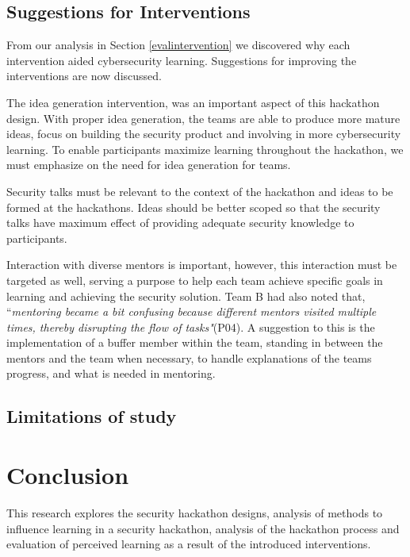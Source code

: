 \documentclass[runningheads]{llncs}
\begin{document}


\subsection{Suggestions for Interventions}
From our analysis in Section \ref{evalintervention} we discovered why each intervention aided cybersecurity learning. Suggestions for improving the interventions are now discussed.

The idea generation intervention, was an important aspect of this hackathon design. With proper idea generation, the teams are able to produce more mature ideas, focus on building the security product and involving in more cybersecurity learning. To enable participants maximize learning throughout the hackathon, we must emphasize on the need for idea generation for teams. %

Security talks must be relevant to the context of the hackathon and ideas to be formed at the hackathons. Ideas should be better scoped so that the security talks have maximum effect of providing adequate security knowledge to participants.


Interaction with diverse mentors is important, however, this interaction must be targeted as well, serving a purpose to help each team achieve specific goals in learning and achieving the security solution. Team B had also noted that, ``\textit{mentoring became a bit confusing because different mentors visited multiple times, thereby disrupting the flow of tasks"}(P04). A suggestion to this is the implementation of a buffer member within the team, standing in between the mentors and the team when necessary, to handle explanations of the teams progress, and what is needed in mentoring.



\subsection{Limitations of study}

\section{Conclusion}
This research explores the security hackathon designs, analysis of methods to influence learning in a security hackathon, analysis of the hackathon process and evaluation of perceived learning as a result of the introduced interventions.

\newpage


\end{document}
